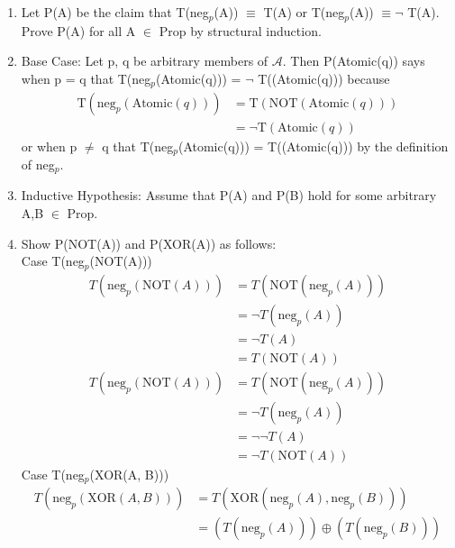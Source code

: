 \documentclass[11pt]{article}
\begin{document}
\subsection{} %
\begin{enumerate}
	\item Let P(A) be the claim that T(neg$_p$(A)) $\equiv$ T(A) or T(neg$_p$(A)) $\equiv \neg$ T(A). Prove P(A) for all A $\in$ Prop by structural induction. 
	\item Base Case: Let p, q be arbitrary members of $\mathcal{A}$. Then P(Atomic(q)) says when p = q that T(neg$_p$(Atomic(q))) = $\neg$ T((Atomic(q))) because 
	\begin{align*}
		\text{T}(\text{neg}_p(\text{Atomic}(q))) &= \text{T}(\text{NOT}(\text{Atomic}(q))) \tag*{Definition of neg$_p$}\\
		&= \neg \text{T}(\text{Atomic}(q)) \tag*{Definition of T}
	\end{align*}
	or when p $\neq$ q that T(neg$_p$(Atomic(q))) = T((Atomic(q))) by the definition of neg$_p$. 
	\item Inductive Hypothesis: Assume that P(A) and P(B) hold for some arbitrary A,B $\in$ Prop. 
	\item Show P(NOT(A)) and P(XOR(A)) as follows:	\\	 
	Case T(neg$_p$(NOT(A)))
	    \begin{align*}
			T(\text{neg}_p(\text{NOT}(A))) &= T(\text{NOT}(\text{neg}_p(A))) \tag*{Definition of ngz} \\
			&= \neg T(\text{neg}_p(A)) \tag*{Definition of T} \\
			&= \neg T(A) \tag*{Inductive Hypothesis} \\
			&= T(\text{NOT}(A)) \tag*{Definition of T}
		\end{align*}
	    \begin{align*}
			T(\text{neg}_p(\text{NOT}(A))) &= T(\text{NOT}(\text{neg}_p(A))) \tag*{Definition of ngz} \\
			&= \neg T(\text{neg}_p(A)) \tag*{Definition of T} \\
			&= \neg \neg T(A) \tag*{Inductive Hypothesis} \\
			&= \neg T(\text{NOT}(A)) \tag*{Definition of T}
		\end{align*}
	Case T(neg$_p$(XOR(A, B)))
		\begin{align*}
			T(\text{neg}_p(\text{XOR}(A, B))) &= T(\text{XOR}(\text{neg}_p(A), \text{neg}_p(B))) \tag*{Definition of ngz} \\
			&= (T(\text{neg}_p(A))) \oplus (T(\text{neg}_p(B))) \tag*{Definition of T} \\

\end{align*}
\end{enumerate}
\end{document}
